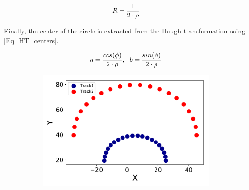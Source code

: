 \begin{equation}
	R = {1 \over {2 \cdot \rho}}
	\label{Eq_R_rho}
\end{equation}

Finally, the center of the circle is extracted from the Hough transformation using \cref{Eq_HT_centers}.


\begin{equation}
	a = {cos(\phi) \over {2 \cdot \rho}},
\,\,\,\,
	b = {sin(\phi) \over {2 \cdot \rho}}
\label{Eq_HT_centers}
\end{equation}


\begin{figure}[ht]
	\centering
	\begin{subfigure}[b]{0.3\textwidth}
        \includegraphics[width=\textwidth]{figures/circle.pdf}
        \caption{}


\end{subfigure}
\end{figure}
